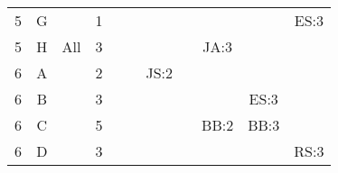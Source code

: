 \documentclass[12pt]{article}
\begin{document}
\begin{table}[H]
\begin{tabular}{@{}c|c|c|c|ccccccc@{}}
5     & G    &            & 1                                                      &                                                 &                                                 &                                                  &                                                  &                                                  &                                                  &  ES:3                                            \\
5     & H    & All        & 3                                                      &                                                 &                                                 &                                                  &                                                  & JA:3                                             &                                                  &                                                  \\
6     & A    &            & 2                                                      &                                                 &                                                 & JS:2                                             &                                                  &                                                  &                                                  &                                                  \\
6     & B    &            & 3                                                      &                                                 &                                                 &                                                  &                                                  &                                                  & ES:3                                             &                                                  \\ 
6     & C    &            & 5                                                      &                                                 &                                                 &                                                  &                                                  & BB:2                                             & BB:3                                             &                                                  \\ 
6     & D    &            & 3                                                      &                                                 &                                                 &                                                  &                                                  &                                                  &                                                  & RS:3                                             \\ 

\end{tabular}
\end{table}
\end{document}
